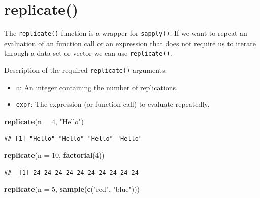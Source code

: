 \documentclass[
]{book}
\newenvironment{Shaded}{\begin{snugshade}}{\end{snugshade}}
\newcommand{\DataTypeTok}[1]{\textcolor[rgb]{0.13,0.29,0.53}{#1}}
\newcommand{\DecValTok}[1]{\textcolor[rgb]{0.00,0.00,0.81}{#1}}
\newcommand{\KeywordTok}[1]{\textcolor[rgb]{0.13,0.29,0.53}{\textbf{#1}}}
\newcommand{\NormalTok}[1]{#1}
\newcommand{\StringTok}[1]{\textcolor[rgb]{0.31,0.60,0.02}{#1}}
\providecommand{\tightlist}{%
  \setlength{\itemsep}{0pt}\setlength{\parskip}{0pt}}
\begin{document}
\hypertarget{replicate-1}{%
\section{replicate()}\label{replicate-1}}

The \texttt{replicate()} function is a wrapper for \texttt{sapply()}. If we want to repeat an evaluation of an function call or an expression that does not require us to iterate through a data set or vector we can use \texttt{replicate()}.

Description of the required \texttt{replicate()} arguments:

\begin{itemize}
\tightlist
\item
  \texttt{n}: An integer containing the number of replications.
\item
  \texttt{expr}: The expression (or function call) to evaluate repeatedly.
\end{itemize}

\begin{Shaded}
\begin{Highlighting}[]
\KeywordTok{replicate}\NormalTok{(}\DataTypeTok{n =} \DecValTok{4}\NormalTok{, }\StringTok{"Hello"}\NormalTok{)}
\end{Highlighting}
\end{Shaded}

\begin{verbatim}
## [1] "Hello" "Hello" "Hello" "Hello"
\end{verbatim}

\begin{Shaded}
\begin{Highlighting}[]
\KeywordTok{replicate}\NormalTok{(}\DataTypeTok{n =} \DecValTok{10}\NormalTok{, }\KeywordTok{factorial}\NormalTok{(}\DecValTok{4}\NormalTok{))}
\end{Highlighting}
\end{Shaded}

\begin{verbatim}
##  [1] 24 24 24 24 24 24 24 24 24 24
\end{verbatim}

\begin{Shaded}
\begin{Highlighting}[]
\KeywordTok{replicate}\NormalTok{(}\DataTypeTok{n =} \DecValTok{5}\NormalTok{, }\KeywordTok{sample}\NormalTok{(}\KeywordTok{c}\NormalTok{(}\StringTok{"red"}\NormalTok{,}
    \StringTok{"blue"}\NormalTok{)))}
\end{Highlighting}
\end{Shaded}
\end{document}
